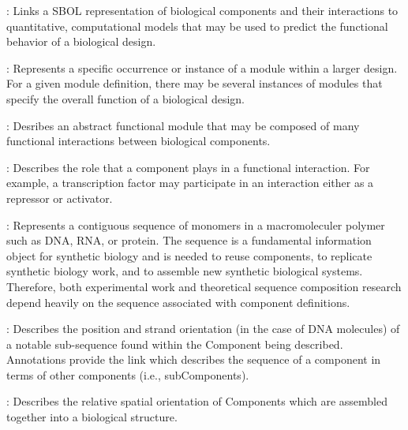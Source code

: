 \begin{description}
\item \emph{}:
Links a SBOL representation of biological components and their interactions to quantitative, computational models that may be used to predict the functional behavior of a biological design.

\item \emph{}:
Represents a specific occurrence or instance of a module within a larger design.  For a given module definition, there may be several instances of modules that specify the overall function of a biological design.

\item \emph{}:
Desribes an abstract functional module that may be composed of many functional interactions between biological components.

\item \emph{}:
Describes the role that a component plays in a functional interaction.  For example, a transcription factor may participate in an interaction either as a repressor or activator.

\item \emph{}:
Represents a contiguous sequence of monomers in a macromoleculer polymer such as DNA, RNA, or protein. The
sequence is a fundamental information object for synthetic biology and is needed to reuse components, to replicate synthetic biology work, and to assemble new synthetic biological systems. Therefore, both experimental work and theoretical sequence composition research depend heavily on the sequence associated with component definitions.

\item \emph{}:
Describes the position and strand orientation (in the case of DNA molecules) of a notable sub-sequence found within the Component being
described. Annotations provide the link which describes the 
sequence of a component in terms of other components (i.e.,
subComponents).

\item \emph{}:
Describes the relative spatial orientation of Components which are assembled together into a biological structure.

\end{description}